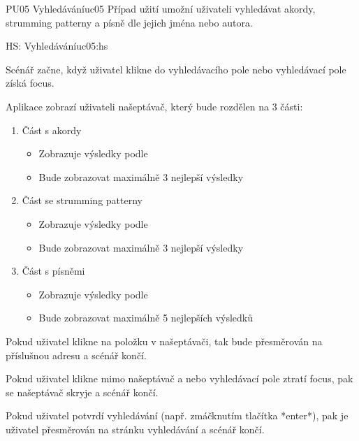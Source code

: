 \begin{usecase}{PU05 Vyhledávání}{uc05}
    Případ užití umožní uživateli vyhledávat akordy, strumming patterny a písně dle jejich jména nebo autora.

    \begin{scenario}{HS: Vyhledávání}{uc05:hs}
        \item Scénář začne, když uživatel klikne do vyhledávacího pole nebo vyhledávací pole získá focus.
        \item Aplikace zobrazí uživateli našeptávač, který bude rozdělen na 3 části:
        \begin{enumerate}
            \item Část s akordy
            \begin{itemize}
                    \item Zobrazuje výsledky podle 
                    \item Bude zobrazovat maximálně 3 nejlepší výsledky
            \end{itemize}
            \item Část se strumming patterny
            \begin{itemize}
                \item Zobrazuje výsledky podle 
                \item Bude zobrazovat maximálně 3 nejlepší výsledky
            \end{itemize}
            \item Část s písněmi
            \begin{itemize}
                \item Zobrazuje výsledky podle 
                \item Bude zobrazovat maximálně 5 nejlepších výsledků
            \end{itemize}
        \end{enumerate}
        \item Pokud uživatel klikne na položku v našeptávači, tak bude přesměrován na příslušnou adresu a scénář končí.
        \item Pokud uživatel klikne mimo našeptávač a nebo vyhledávací pole ztratí focus, pak se našeptávač skryje a scénář končí.
        \item Pokud uživatel potvrdí vyhledávání (např. zmáčknutím tlačítka *enter*), pak je uživatel přesměrován na stránku vyhledávání a scénář končí.
    \end{scenario}


\end{usecase}
